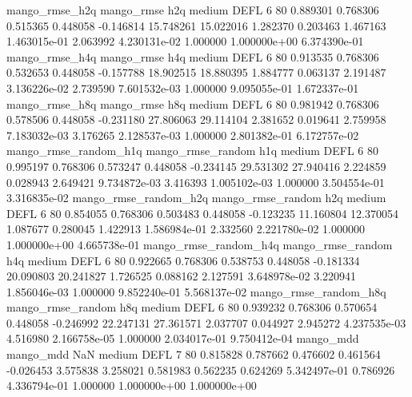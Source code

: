        mango_rmse_h2q        mango_rmse                  h2q     medium     DEFL                 6 80  0.889301       0.768306 0.515365       0.448058   -0.146814     15.748261     15.022016     1.282370       0.203463  1.467163 1.463015e-01     2.063992   4.230131e-02            1.000000    1.000000e+00        6.374390e-01
       mango_rmse_h4q        mango_rmse                  h4q     medium     DEFL                 6 80  0.913535       0.768306 0.532653       0.448058   -0.157788     18.902515     18.880395     1.884777       0.063137  2.191487 3.136226e-02     2.739590   7.601532e-03            1.000000    9.095055e-01        1.672337e-01
       mango_rmse_h8q        mango_rmse                  h8q     medium     DEFL                 6 80  0.981942       0.768306 0.578506       0.448058   -0.231180     27.806063     29.114104     2.381652       0.019641  2.759958 7.183032e-03     3.176265   2.128537e-03            1.000000    2.801382e-01        6.172757e-02
mango_rmse_random_h1q mango_rmse_random                  h1q     medium     DEFL                 6 80  0.995197       0.768306 0.573247       0.448058   -0.234145     29.531302     27.940416     2.224859       0.028943  2.649421 9.734872e-03     3.416393   1.005102e-03            1.000000    3.504554e-01        3.316835e-02
mango_rmse_random_h2q mango_rmse_random                  h2q     medium     DEFL                 6 80  0.854055       0.768306 0.503483       0.448058   -0.123235     11.160804     12.370054     1.087677       0.280045  1.422913 1.586984e-01     2.332560   2.221780e-02            1.000000    1.000000e+00        4.665738e-01
mango_rmse_random_h4q mango_rmse_random                  h4q     medium     DEFL                 6 80  0.922665       0.768306 0.538753       0.448058   -0.181334     20.090803     20.241827     1.726525       0.088162  2.127591 3.648978e-02     3.220941   1.856046e-03            1.000000    9.852240e-01        5.568137e-02
mango_rmse_random_h8q mango_rmse_random                  h8q     medium     DEFL                 6 80  0.939232       0.768306 0.570654       0.448058   -0.246992     22.247131     27.361571     2.037707       0.044927  2.945272 4.237535e-03     4.516980   2.166758e-05            1.000000    2.034017e-01        9.750412e-04
            mango_mdd         mango_mdd                  NaN     medium     DEFL                 7 80  0.815828       0.787662 0.476602       0.461564   -0.026453      3.575838      3.258021     0.581983       0.562235  0.624269 5.342497e-01     0.786926   4.336794e-01            1.000000    1.000000e+00        1.000000e+00
